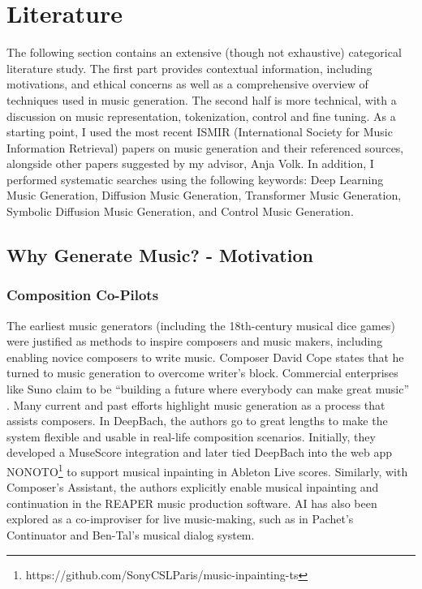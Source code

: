 

\chapter{Literature} \label{chap:data}
\pagestyle{fancy}

The following section contains an extensive (though not exhaustive) categorical literature study. The first part provides contextual information, including motivations, and ethical concerns as well as a comprehensive overview of techniques used in music generation. The second half is more technical, with a discussion on music representation, tokenization, control and fine tuning. As a starting point, I used the most recent ISMIR (International Society for Music Information Retrieval) papers on music generation and their referenced sources, alongside other papers suggested by my advisor, Anja Volk. In addition, I performed systematic searches using the following keywords: Deep Learning Music Generation, Diffusion Music Generation, Transformer Music Generation, Symbolic Diffusion Music Generation, and Control Music Generation.

\section{Why Generate Music? - Motivation  \label{section:motivation}}
\subsection{Composition Co-Pilots}
The earliest music generators (including the 18th-century musical dice games\cite{Nierhaus_2009}) were justified as methods to inspire composers and music makers, including enabling novice composers to write music. Composer David Cope\cite{Cope_1989} states that he turned to music generation to overcome writer’s block. Commercial enterprises like Suno claim to be “building a future where everybody can make great music” \cite{Suno_AI}. Many current and past efforts highlight music generation as a process that assists composers. In DeepBach\cite{Hadjeres_Pachet_Nielsen_2017}, the authors go to great lengths to make the system flexible and usable in real-life composition scenarios. Initially, they developed a MuseScore integration and later tied DeepBach into the web app NONOTO\footnote{https://github.com/SonyCSLParis/music-inpainting-ts} to support musical inpainting in Ableton Live scores. Similarly, with Composer’s Assistant\cite{Malandro_2023}, the authors explicitly enable musical inpainting and continuation in the REAPER music production software. AI has also been explored as a co-improviser for live music-making, such as in Pachet's Continuator\cite{Pachet_2003} and Ben-Tal's musical dialog system\cite{Kite-Powell_2023}.


